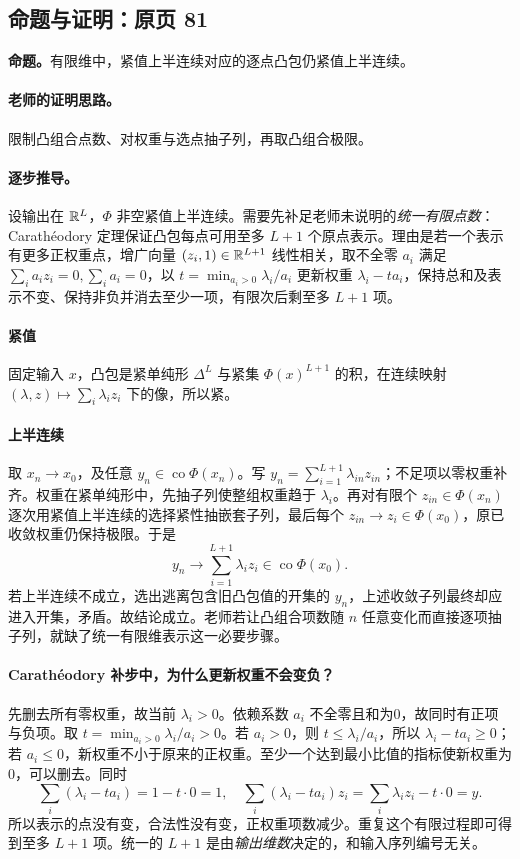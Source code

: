 \subsection{命题与证明：原页 81}

\textbf{命题。}有限维中，紧值上半连续对应的逐点凸包仍紧值上半连续。

\paragraph{老师的证明思路。}限制凸组合点数、对权重与选点抽子列，再取凸组合极限。

\paragraph{逐步推导。}
设输出在 $\mathbb{R}^L$，$\Phi$ 非空紧值上半连续。需要先补足老师未说明的\emph{统一有限点数}：Carathéodory 定理保证凸包每点可用至多 $L+1$ 个原点表示。理由是若一个表示有更多正权重点，增广向量 $(z_i,1)\in\mathbb{R}^{L+1}$ 线性相关，取不全零 $a_i$ 满足 $\sum_i a_iz_i=0,\sum_i a_i=0$，以 $t=\min_{a_i>0}\lambda_i/a_i$ 更新权重 $\lambda_i-ta_i$，保持总和及表示不变、保持非负并消去至少一项，有限次后剩至多 $L+1$ 项。
\paragraph{紧值}固定输入 $x$，凸包是紧单纯形 $\Delta^L$ 与紧集 $\Phi(x)^{L+1}$ 的积，在连续映射 $(\lambda,z)\mapsto\sum_i\lambda_i z_i$ 下的像，所以紧。
\paragraph{上半连续}取 $x_n\to x_0$，及任意 $y_n\in\operatorname{co}\Phi(x_n)$。写 $y_n=\sum_{i=1}^{L+1}\lambda_{in}z_{in}$；不足项以零权重补齐。权重在紧单纯形中，先抽子列使整组权重趋于 $\lambda_i$。再对有限个 $z_{in}\in\Phi(x_n)$ 逐次用紧值上半连续的选择紧性抽嵌套子列，最后每个 $z_{in}\to z_i\in\Phi(x_0)$，原已收敛权重仍保持极限。于是
\[y_n\to\sum_{i=1}^{L+1}\lambda_i z_i\in\operatorname{co}\Phi(x_0).\]
若上半连续不成立，选出逃离包含旧凸包值的开集的 $y_n$，上述收敛子列最终却应进入开集，矛盾。故结论成立。老师若让凸组合项数随 $n$ 任意变化而直接逐项抽子列，就缺了统一有限维表示这一必要步骤。



\paragraph{Carathéodory 补步中，为什么更新权重不会变负？}
先删去所有零权重，故当前 $\lambda_i>0$。依赖系数 $a_i$ 不全零且和为0，故同时有正项与负项。取 $t=\min_{a_i>0}\lambda_i/a_i>0$。若 $a_i>0$，则 $t\le\lambda_i/a_i$，所以 $\lambda_i-ta_i\ge0$；若 $a_i\le0$，新权重不小于原来的正权重。至少一个达到最小比值的指标使新权重为0，可以删去。同时
\[\sum_i(\lambda_i-ta_i)=1-t\cdot0=1,
\quad \sum_i(\lambda_i-ta_i)z_i=\sum_i\lambda_i z_i-t\cdot0=y.
\]
所以表示的点没有变，合法性没有变，正权重项数减少。重复这个有限过程即可得到至多 $L+1$ 项。统一的 $L+1$ 是由\emph{输出维数}决定的，和输入序列编号无关。


